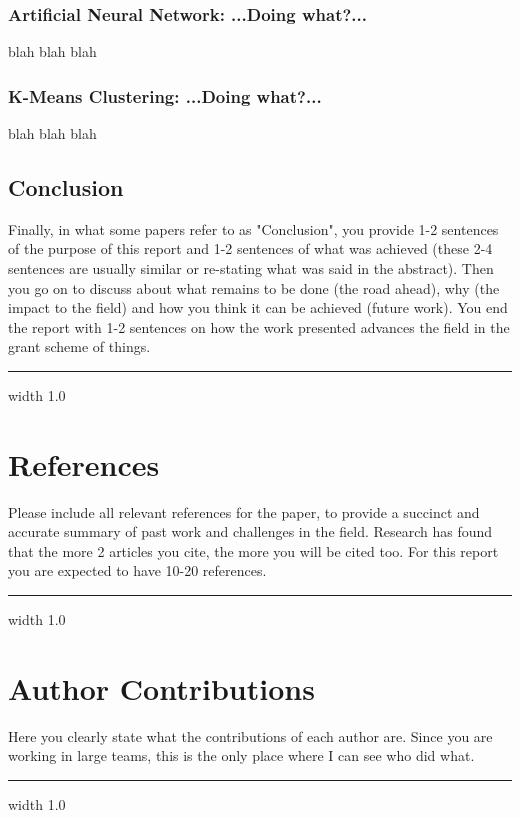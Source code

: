 \documentclass[11pt]{article}
\newcommand{\horizontalLine}{
	\begin{center}
		\hrule width 1.0\textwidth
	\end{center}
}
\begin{document}
\subsubsection{Artificial Neural Network: ...Doing what?...}
\label{subsubsec:ann}
blah blah blah

\subsubsection{K-Means Clustering: ...Doing what?...}
\label{subsubsec:kMeans}
blah blah blah

\subsection{Conclusion}
\label{subsec:conclusion}
Finally, in what some papers refer to as "Conclusion", you provide 1-2 sentences of the purpose
of this report and 1-2 sentences of what was achieved (these 2-4 sentences are usually similar
or re-stating what was said in the abstract). Then you go on to discuss about what remains to
be done (the road ahead), why (the impact to the field) and how you think it can be achieved
(future work). You end the report with 1-2 sentences on how the work presented advances the
field in the grant scheme of things.

\horizontalLine
\section{References}
\label{sec:references}
 Please include all relevant references for the paper, to provide a succinct and accurate
 summary of past work and challenges in the field. Research has found that the more
 2
 articles you cite, the more you will be cited too. For this report you are expected to have 10-20
 references.

\horizontalLine
\section{Author Contributions}
\label{sec:authorContributions}
 Here you clearly state what the contributions of each author are. Since
 you are working in large teams, this is the only place where I can see who did what.

\horizontalLine
\appendix
\end{document}

